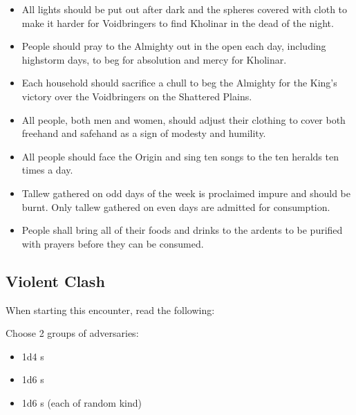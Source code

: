 \begin{itemize}
	\item All lights should be put out after dark and the spheres covered with cloth to make it harder for Voidbringers to find Kholinar in the dead of the night.
	
	\item People should pray to the Almighty out in the open each day, including highstorm days, to beg for absolution and mercy for Kholinar.
	
	\item Each household should sacrifice a chull to beg the Almighty for the King's victory over the Voidbringers on the Shattered Plains.
	
	\item All people, both men and women, should adjust their clothing to cover both freehand and safehand as a sign of modesty and humility.
	
	\item All people should face the Origin and sing ten songs to the ten heralds ten times a day.
	
	\item Tallew gathered on odd days of the week is proclaimed impure and should be burnt. Only tallew gathered on even days are admitted for consumption.
	
	\item People shall bring all of their foods and drinks to the ardents to be purified with prayers before they can be consumed.	
\end{itemize}



\subsection{Violent Clash}

When starting this encounter, read the following:


Choose 2 groups of adversaries:
\begin{itemize}
	\item 1d4 \enemyWallGuard{}s
	\item 1d6 \enemyRioter{}s
	\item 1d6 \enemyCultist{}s (each \enemyCultistOfMoments{} of random kind)
\end{itemize}

